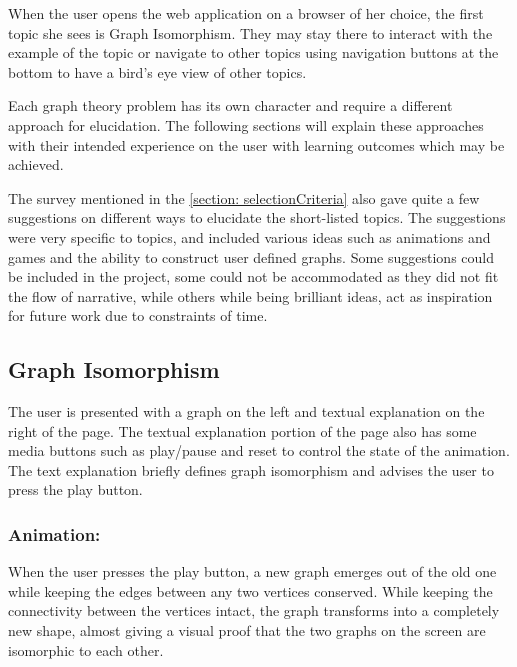 When the user opens the web application on a browser of her choice, the first
topic she sees is Graph Isomorphism. They may stay there to interact
with the example of the topic or navigate to other topics using navigation
buttons at the bottom to have a bird's eye view of other topics.

Each graph theory problem has its own character and require a different
approach for elucidation. The following sections will explain these approaches
with their intended experience on the user with learning outcomes which may be
achieved.

The survey mentioned in the \autoref{section: selectionCriteria} also gave
quite a few suggestions on different ways to elucidate the short-listed topics.
The suggestions were very specific to topics, and included various ideas such as
animations and games and the ability to construct user defined graphs. Some suggestions could be included in the project, some could not be
accommodated as they did not fit the flow of narrative, while others while being
brilliant ideas, act as inspiration for future work due to constraints of time.

\subsection{Graph Isomorphism}
\label{story: isomorphism}
The user is presented with a graph on the left and textual explanation on the
right of the page.  The textual explanation portion of the page also has some
media buttons such as play/pause and reset to control the state of the
animation. The text explanation briefly defines graph isomorphism and advises
the user to press the play button.

\subsubsection{Animation:}
When the user presses the play button, a new graph emerges out of the old one
while keeping the edges between any two vertices conserved. 
While keeping the connectivity between the vertices intact, the graph
transforms into a completely new shape, almost giving a visual proof that the
two graphs on the screen are isomorphic to each other.

